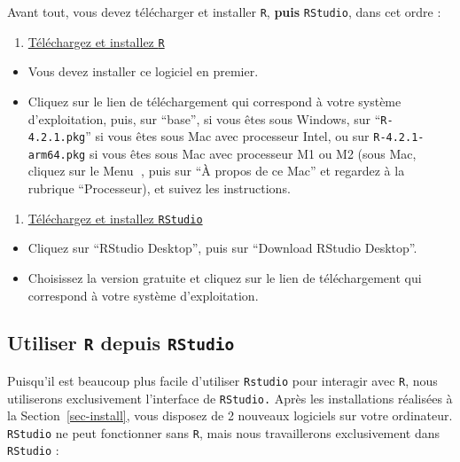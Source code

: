 \documentclass[
  letterpaper,
  DIV=11,
  numbers=noendperiod]{scrreprt}
\providecommand{\tightlist}{%
  \setlength{\itemsep}{0pt}\setlength{\parskip}{0pt}}\usepackage{longtable,booktabs,array}
\begin{document}
Avant tout, vous devez télécharger et installer \texttt{R},
\textbf{puis} \texttt{RStudio}, dans cet ordre :

\begin{enumerate}
\def\labelenumi{\arabic{enumi}.}
\tightlist
\item
  \href{https://cran.r-project.org}{Téléchargez et installez \texttt{R}}
\end{enumerate}

\begin{itemize}
\tightlist
\item
  Vous devez installer ce logiciel en premier.
\item
  Cliquez sur le lien de téléchargement qui correspond à votre système
  d'exploitation, puis, sur ``base'', si vous êtes sous Windows, sur
  ``\texttt{R-4.2.1.pkg}'' si vous êtes sous Mac avec processeur Intel,
  ou sur \texttt{R-4.2.1-arm64.pkg} si vous êtes sous Mac avec
  processeur M1 ou M2 (sous Mac, cliquez sur le Menu , puis sur ``À
  propos de ce Mac'' et regardez à la rubrique ``Processeur), et suivez
  les instructions.
\end{itemize}

\begin{enumerate}
\def\labelenumi{\arabic{enumi}.}
\setcounter{enumi}{1}
\tightlist
\item
  \href{https://www.rstudio.com/products/RStudio/\#Desktop}{Téléchargez
  et installez \texttt{RStudio}}
\end{enumerate}

\begin{itemize}
\tightlist
\item
  Cliquez sur ``RStudio Desktop'', puis sur ``Download RStudio
  Desktop''.
\item
  Choisissez la version gratuite et cliquez sur le lien de
  téléchargement qui correspond à votre système d'exploitation.
\end{itemize}

\hypertarget{utiliser-r-depuis-rstudio}{%
\subsection{\texorpdfstring{Utiliser \texttt{R} depuis
\texttt{RStudio}}{Utiliser R depuis RStudio}}\label{utiliser-r-depuis-rstudio}}

Puisqu'il est beaucoup plus facile d'utiliser \texttt{Rstudio} pour
interagir avec \texttt{R}, nous utiliserons exclusivement l'interface de
\texttt{RStudio.} Après les installations réalisées à la
Section~\ref{sec-install}, vous disposez de 2 nouveaux logiciels sur
votre ordinateur. \texttt{RStudio} ne peut fonctionner sans \texttt{R},
mais nous travaillerons exclusivement dans \texttt{RStudio} :
\end{document}
